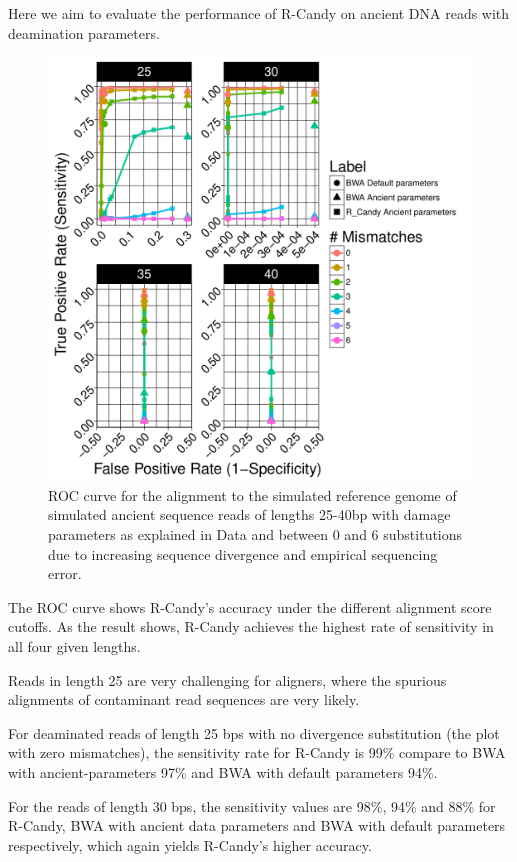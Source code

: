 \documentclass[11pt,a4paper]{report}
\begin{document}
Here we aim to evaluate the performance of R-Candy on ancient DNA reads
with deamination parameters.


\begin{figure}[H]
\centering
\includegraphics[width=12cm]{pictures/bROC_DS1_emp.pdf}

\caption{
ROC curve for the alignment to the simulated reference genome of simulated ancient 
sequence reads of lengths 25-40bp with damage parameters as explained in Data 
and between 0 and 6 substitutions due to increasing sequence divergence and
empirical sequencing error.
}
\label{DS1_emp}
\end{figure}



The ROC curve shows R-Candy's accuracy under the different alignment score 
cutoffs. As the result shows, R-Candy achieves the highest rate of sensitivity
in all four given lengths.

Reads in length 25 are very challenging for aligners, where
the spurious alignments of contaminant read sequences are very likely.

For deaminated reads of length 25 bps with no divergence substitution 
(the plot with zero mismatches), the sensitivity rate for R-Candy is 99\% 
compare to BWA with ancient-parameters 97\% and BWA with default parameters 94\%. 


For the reads of length 30 bps, the sensitivity values are 98\%, 94\% 
and 88\% for R-Candy, BWA with ancient data parameters and BWA with 
default parameters respectively, which again yields R-Candy's higher
accuracy.
\end{document}
